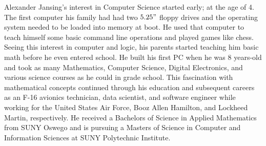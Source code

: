 \begin{vita}

Alexander Jansing's interest in Computer Science started early; at the age of 4. The first computer his family had had two $5.25"$ floppy drives and the operating system needed to be loaded into memory at boot. He used that computer to teach himself some basic command line operations and played games like chess. Seeing this interest in computer and logic, his parents started teaching him basic math before he even entered school. He built his first PC when he was 8 years-old and took as many Mathematics, Computer Science, Digital Electronics, and various science courses as he could in grade school. This fascination with mathematical concepts continued through his education and subsequent careers as an F-16 avionics technician, data scientist, and software engineer while working for the United States Air Force, Booz Allen Hamilton, and Lockheed Martin, respectively. He received a Bachelors of Science in Applied Mathematics from SUNY Oswego and is pursuing a Masters of Science in Computer and Information Sciences at SUNY Polytechnic Institute.
\end{vita}
